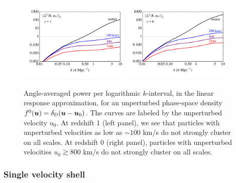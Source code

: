 \documentclass[useAMS, usenatbib]{mnras}
\newcommand{\bs}{\boldsymbol}
\begin{document}
\begin{figure}
\includegraphics[width=0.47\textwidth]{nuplots/lin_resp_z1.pdf}
\includegraphics[width=0.47\textwidth]{nuplots/lin_resp_z0.pdf}
\caption{Angle-averaged power per logarithmic $k$-interval, in the linear response approximation, for an unperturbed phase-space density $f^0(\bs{u}) = \delta_{\rm D}(\bs{u}- \bs{u}_0)$. The curves are labeled by the unperturbed velocity $u_0$. At redshift 1 (left panel), we see that particles with unperturbed velocities as low as $\sim 100$ km/s do not strongly cluster on all scales. At redshift 0 (right panel), particles with unperturbed velocities $u_0 \gtrsim 800$ km/s do not strongly cluster on all scales.}
\label{fig:halofitvshell}
\end{figure}


\subsubsection{Single velocity shell}
\end{document}
